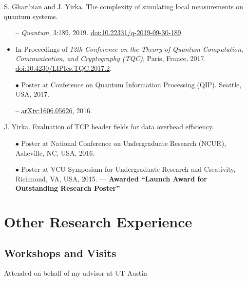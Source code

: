 \documentclass[11pt,letterpaper,serif]{moderncv}
\newcommand{\pubItemSep}{0em}
\begin{document}
S. Gharibian and J. Yirka.\quad
The complexity of simulating local measurements on quantum systems.
\begin{adjustwidth}{.1in}{}
	\begin{itemize}[itemsep=\pubItemSep]
		\item[--] \textit{Quantum}, 3:189, 2019. \quad
		\href{https://doi.org/10.22331/q-2019-09-30-189}{doi:10.22331/q-2019-09-30-189}.
		\item In Proceedings of \textit{12th Conference on the Theory of Quantum Computation, Communication,
		and Cryptography (TQC)}, Paris, France, 2017. \quad
		\href{https://doi.org/10.4230/LIPIcs.TQC.2017.2}{doi:10.4230/LIPIcs.TQC.2017.2}.
		\item[$\bullet$] Poster at Conference on Quantum Information Processing (QIP). Seattle, USA, 2017.
		\item[--] \href{https://arxiv.org/abs/1606.05626}{arXiv:1606.05626}, 2016.
	\end{itemize}
\end{adjustwidth}
\medskip

J. Yirka.\quad
Evaluation of TCP header fields for data overhead efficiency.
\begin{adjustwidth}{.1in}{}
	\begin{itemize}[itemsep=\pubItemSep]
		\item[$\bullet$] Poster at National Conference on Undergraduate Research (NCUR), Asheville, NC, USA, 2016.
		\item[$\bullet$] Poster at VCU Symposium for Undergraduate Research and Creativity, Richmond, VA, USA, 2015. --- \textbf{Awarded ``Launch Award for Outstanding Research Poster''}
	\end{itemize}
\end{adjustwidth}


\section{Other Research Experience}
\subsection{Workshops and Visits}

{
	\begin{adjustwidth}{.25in}{}
		Attended on behalf of my advisor at UT Austin
	\end{adjustwidth}
}
\end{document}
